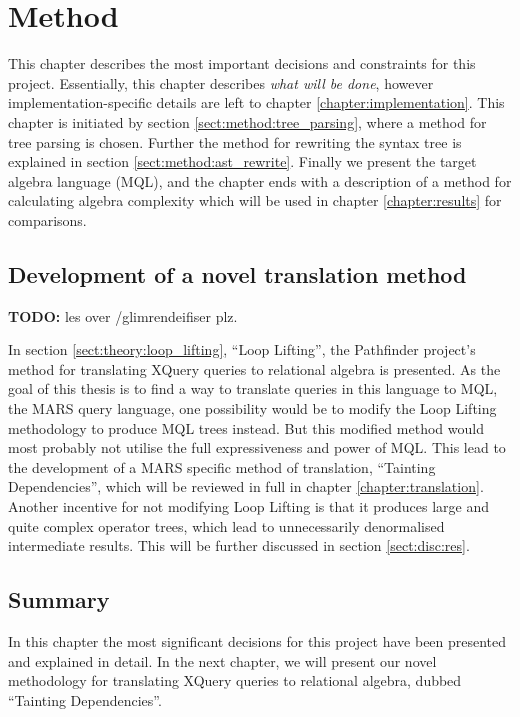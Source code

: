 \chapter{Method}
\label{chapter:method}
This chapter describes the most important decisions and constraints for this
project. Essentially, this chapter describes \emph{what will be done}, however
implementation-specific details are left to chapter
\ref{chapter:implementation}. This chapter is initiated by section
\ref{sect:method:tree_parsing}, where a method for tree parsing is chosen.
Further the method for rewriting the syntax tree is explained in section
\ref{sect:method:ast_rewrite}. Finally we present the target algebra language
(MQL), and the chapter ends with a description of a method for calculating
algebra complexity which will be used in chapter \ref{chapter:results} for
comparisons.

\section{Development of a novel translation method}
\textbf{\LARGE TODO:} les over /glimrendeifiser plz.

In section \ref{sect:theory:loop_lifting}, ``Loop Lifting'', the Pathfinder project's method for translating XQuery
queries to relational algebra is presented. As the goal of this thesis is to
find a way to translate queries in this language to MQL, the MARS query language, one possibility would be to modify the Loop Lifting
methodology to produce MQL trees instead. But this modified method would most probably not utilise the full
expressiveness and power of MQL. This lead to the development of a MARS specific method of translation, ``Tainting
Dependencies'', which will be reviewed in full in chapter \ref{chapter:translation}. Another incentive for not
modifying Loop Lifting is that it produces large and quite complex operator
trees, which lead to unnecessarily denormalised intermediate results. This
will be further discussed in section \ref{sect:disc:res}.








\section{Summary}
\label{sect:method:summary}
In this chapter the most significant decisions for this project have been
presented and explained in detail. In the next chapter, we will present our
novel methodology for translating XQuery queries to relational algebra, dubbed
``Tainting Dependencies''.
